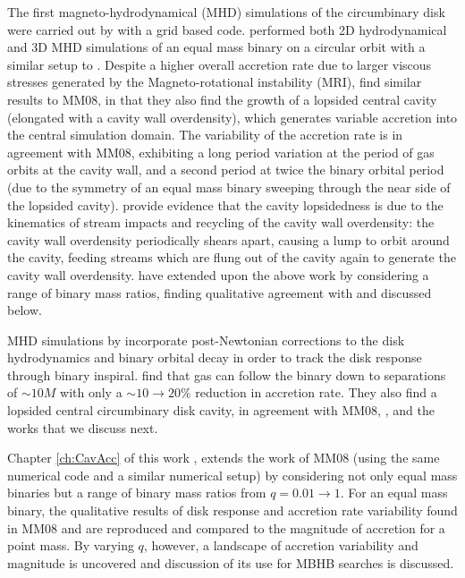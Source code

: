 The first magneto-hydrodynamical (MHD) simulations of the circumbinary disk
were carried out by \cite{ShiKrolik:2012} with a grid based code.
\cite{ShiKrolik:2012}  performed both 2D hydrodynamical and 3D MHD simulations
of an equal mass binary on a circular orbit with a similar setup to
\citep{MacFadyen:2008}. Despite a higher overall accretion rate due to larger
viscous stresses generated by the Magneto-rotational instability (MRI),
\cite{ShiKrolik:2012} find similar results to MM08, in that they also find the
growth of a lopsided central cavity (elongated with a cavity wall
overdensity), which generates variable accretion into the central simulation
domain. The variability of the accretion rate is in agreement with MM08,
exhibiting a long period variation at the period of gas orbits at the cavity
wall, and a second period at twice the binary orbital period (due to the
symmetry of an equal mass binary sweeping through the near side of the lopsided
cavity). \cite{ShiKrolik:2012} provide evidence that the cavity lopsidedness is
due to the kinematics of stream impacts and recycling of the cavity wall
overdensity: the cavity wall overdensity periodically shears apart, causing a
lump to orbit around the cavity, feeding streams which are flung out of the
cavity again to generate the cavity wall overdensity. \cite{ShiKrolik:2015}
have extended upon the above work by considering a range of binary mass ratios,
finding qualitative agreement with \cite{DHM:2013:MNRAS} and \cite{Farris:2014}
discussed below.

MHD simulations by \citep{Noble+2012} incorporate post-Newtonian corrections
to the disk hydrodynamics and binary orbital decay in order to track the disk
response through binary inspiral. \citep{Noble+2012} find that gas can follow
the binary down to separations of $\sim10M$ with only a $\sim10 \rightarrow 20\%$
reduction in accretion rate. They also find a lopsided central circumbinary
disk cavity, in agreement with MM08, \citep{ShiKrolik:2012}, and the works
that we discuss next.

Chapter \ref{ch:CavAcc} of this work \citep{DHM:2013:MNRAS}, extends the work
of MM08 (using the same numerical code and a similar numerical setup) by
considering not only equal mass binaries but a range of binary mass ratios
from $q=0.01 \rightarrow 1$. For an equal mass binary, the qualitative results
of disk response and accretion rate variability found in MM08 and
\citep{ShiKrolik:2012} are reproduced and compared to the magnitude of
accretion for a point mass. By varying $q$, however, a landscape of accretion
variability and magnitude is uncovered and discussion of its use for MBHB
searches is discussed.

